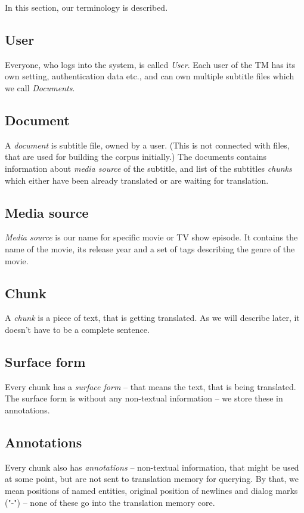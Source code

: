 \label{sec:glossary}

In this section, our terminology is described.

\subsection*{User}
Everyone, who logs into the system, is called \emph{User}. Each user of the TM has its own setting, authentication data etc., and can own multiple subtitle files which we call \emph{Documents}.

\subsection*{Document}
A \emph{document} is subtitle file, owned by a user. (This is not connected with files, that are used for building the corpus initially.) The documents contains information about \emph{media source} of the subtitle, and list of the subtitles \emph{chunks} which either have been already translated or are waiting for translation.

\subsection*{Media source}
\emph{Media source} is our name for specific movie or TV show episode. It contains the name of the movie, its release year and a set of tags describing the genre of the movie.

\subsection*{Chunk}
A \emph{chunk} is a piece of text, that is getting translated. As we will describe later, it doesn't have to be a complete sentence.

\subsection*{Surface form}
Every chunk has a \emph{surface form} -- that means the text, that is being translated. The surface form is without any non-textual information -- we store these in annotations.

\subsection*{Annotations}
Every chunk also has \emph{annotations} -- non-textual information, that might be used at some point, but are not sent to translation memory for querying. By that, we mean positions of named entities, original position of newlines and dialog marks ("-") -- none of these go into the translation memory core.

